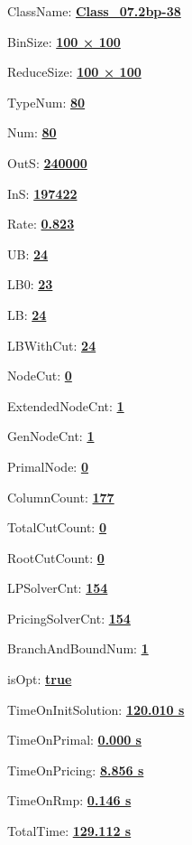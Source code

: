 \documentclass[11pt]{article}
\begin{document}
\pagestyle{empty}


ClassName: \underline{\textbf{Class_07.2bp-38}}
\par
BinSize: \underline{\textbf{100 × 100}}
\par
ReduceSize: \underline{\textbf{100 × 100}}
\par
TypeNum: \underline{\textbf{80}}
\par
Num: \underline{\textbf{80}}
\par
OutS: \underline{\textbf{240000}}
\par
InS: \underline{\textbf{197422}}
\par
Rate: \underline{\textbf{0.823}}
\par
UB: \underline{\textbf{24}}
\par
LB0: \underline{\textbf{23}}
\par
LB: \underline{\textbf{24}}
\par
LBWithCut: \underline{\textbf{24}}
\par
NodeCut: \underline{\textbf{0}}
\par
ExtendedNodeCnt: \underline{\textbf{1}}
\par
GenNodeCnt: \underline{\textbf{1}}
\par
PrimalNode: \underline{\textbf{0}}
\par
ColumnCount: \underline{\textbf{177}}
\par
TotalCutCount: \underline{\textbf{0}}
\par
RootCutCount: \underline{\textbf{0}}
\par
LPSolverCnt: \underline{\textbf{154}}
\par
PricingSolverCnt: \underline{\textbf{154}}
\par
BranchAndBoundNum: \underline{\textbf{1}}
\par
isOpt: \underline{\textbf{true}}
\par
TimeOnInitSolution: \underline{\textbf{120.010 s}}
\par
TimeOnPrimal: \underline{\textbf{0.000 s}}
\par
TimeOnPricing: \underline{\textbf{8.856 s}}
\par
TimeOnRmp: \underline{\textbf{0.146 s}}
\par
TotalTime: \underline{\textbf{129.112 s}}
\par
\newpage


\end{document}
